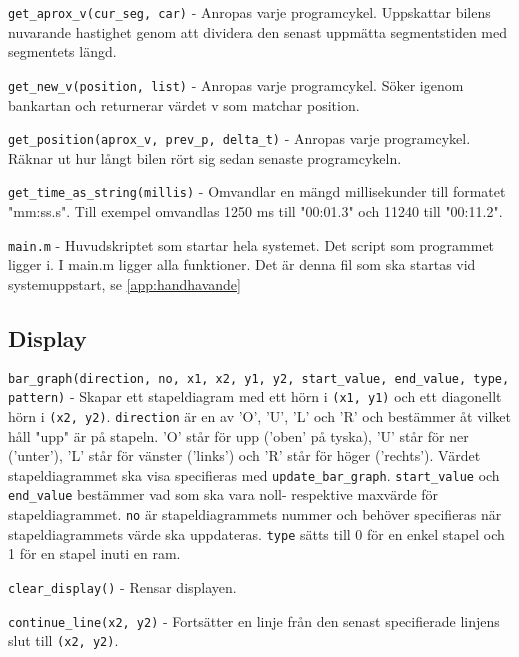 \texttt{get\_aprox\_v(cur\_seg, car)} - Anropas varje programcykel. Uppskattar
bilens nuvarande hastighet genom att dividera den senast uppmätta segmentstiden
med segmentets längd.


\texttt{get\_new\_v(position, list)} - Anropas varje programcykel. Söker igenom
bankartan och returnerar värdet v som matchar position.

\texttt{get\_position(aprox\_v, prev\_p, delta\_t)} - Anropas varje
programcykel. Räknar ut hur långt bilen rört sig sedan senaste programcykeln.


\texttt{get\_time\_as\_string(millis)} - Omvandlar en mängd millisekunder till
formatet "mm:ss.s". Till exempel omvandlas 1250 ms till "00:01.3" och 11240 till
"00:11.2".

\texttt{main.m} - Huvudskriptet som startar hela systemet. Det script som
programmet ligger i. I main.m ligger alla funktioner. Det är denna fil som ska
startas vid systemuppstart, se \ref{app:handhavande}

\subsection{Display}
\label{app:funktioner och filer:display}

\texttt{bar\_graph(direction, no, x1, x2, y1, y2, start\_value, end\_value,
type, pattern)} - Skapar ett stapeldiagram med ett hörn i \texttt{(x1, y1)} och ett
diagonellt hörn i \texttt{(x2, y2)}. \texttt{direction} är en av 'O', 'U', 'L' och 'R' och
bestämmer åt vilket håll "upp" är på stapeln. 'O' står för upp ('oben' på
tyska), 'U' står för ner ('unter'), 'L' står för vänster ('links') och 'R' står
för höger ('rechts'). Värdet stapeldiagrammet ska visa specifieras med
\texttt{update\_bar\_graph}. \texttt{start\_value} och \texttt{end\_value}
bestämmer vad som ska vara noll- respektive maxvärde för stapeldiagrammet.
\texttt{no} är stapeldiagrammets nummer och behöver specifieras när
stapeldiagrammets värde ska uppdateras. \texttt{type} sätts till 0 för en enkel stapel
och 1 för en stapel inuti en ram.

\texttt{clear\_display()} - Rensar displayen.

\texttt{continue\_line(x2, y2)} - Fortsätter en linje från den senast specifierade
linjens slut till \texttt{(x2, y2)}.

